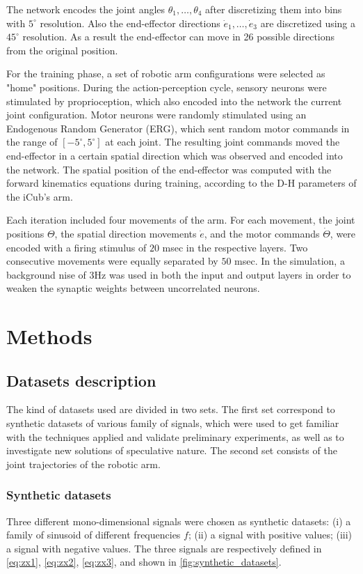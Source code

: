 \documentclass[10pt,a4paper, final]{report} %
\begin{document}
The network encodes the joint angles $\theta_1, \ldots, \theta_4$ after discretizing them into bins with $5^\circ$ resolution. Also the end-effector directions $\dot{e}_1, \ldots, \dot{e}_3$ are discretized using a $45^\circ$ resolution. As a result the end-effector can move in 26 possible directions from the original position.

For the training phase, a set of robotic arm configurations were selected as "home" positions. During the action-perception cycle, sensory neurons were stimulated by proprioception, which also encoded into the network the current joint configuration. 
Motor neurons were randomly stimulated using an Endogenous Random Generator (ERG), which sent random motor commands in the range of $[-5^\circ, 5^\circ]$ at each joint.
The resulting joint commands moved the end-effector in a certain spatial direction which was observed and encoded into the network. The spatial position of the end-effector was computed with the forward kinematics equations during training, according to the D-H parameters of the iCub's arm.

Each iteration included four movements of the arm. For each movement, the joint positions $\Theta$, the spatial direction movements $\dot{e}$, and the motor commands $\dot{\Theta}$, were encoded with a firing stimulus of $20$ msec in the respective layers. Two consecutive movements were equally separated by $50$ msec. In the simulation, a background nise of $3$Hz was used in both the input and output layers in order to weaken the synaptic weights between uncorrelated neurons.


\chapter{Methods}
\label{cap:method}

\section{Datasets description}
\label{sec:datasets}
The kind of datasets used are divided in two sets. The first set correspond to synthetic datasets of various family of signals, which were used to get familiar with the techniques applied and validate preliminary experiments, as well as to investigate new solutions of speculative nature. The second set consists of the joint trajectories of the robotic arm.

\subsection{Synthetic datasets}
Three different mono-dimensional signals were chosen as synthetic datasets: (i) a family of sinusoid of different frequencies $f$; (ii) a signal with positive values; (iii) a signal with negative values. The three signals are respectively defined in \eqref{eq:zx1}, \eqref{eq:zx2}, \eqref{eq:zx3}, and shown in \autoref{fig:synthetic_datasets}.
\end{document}
